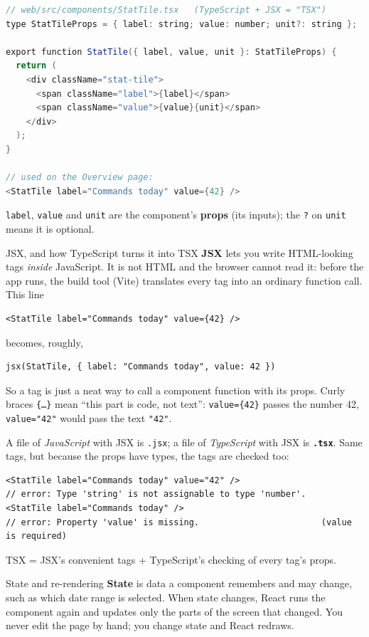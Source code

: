 \documentclass[11pt,a4paper]{article}
\begin{document}
\begin{lstlisting}[language=Java]
// web/src/components/StatTile.tsx   (TypeScript + JSX = "TSX")
type StatTileProps = { label: string; value: number; unit?: string };

export function StatTile({ label, value, unit }: StatTileProps) {
  return (
    <div className="stat-tile">
      <span className="label">{label}</span>
      <span className="value">{value}{unit}</span>
    </div>
  );
}

// used on the Overview page:
<StatTile label="Commands today" value={42} />
\end{lstlisting}

\noindent \texttt{label}, \texttt{value} and \texttt{unit} are the component's \textbf{props} (its
inputs); the \texttt{?} on \texttt{unit} means it is optional.

\begin{concept}{JSX, and how TypeScript turns it into TSX}
\textbf{JSX} lets you write HTML-looking tags \emph{inside} JavaScript. It is not HTML and the
browser cannot read it: before the app runs, the build tool (Vite) translates every tag into an
ordinary function call. This line
\begin{lstlisting}
<StatTile label="Commands today" value={42} />
\end{lstlisting}
becomes, roughly,
\begin{lstlisting}
jsx(StatTile, { label: "Commands today", value: 42 })
\end{lstlisting}
So a tag is just a neat way to call a component function with its props. Curly braces
\texttt{\{\ldots\}} mean ``this part is code, not text'': \texttt{value=\{42\}} passes the number 42,
\texttt{value="42"} would pass the text \texttt{"42"}.

A file of \emph{JavaScript} with JSX is \texttt{.jsx}; a file of \emph{TypeScript} with JSX is
\textbf{\texttt{.tsx}}. Same tags, but because the props have types, the tags are checked too:
\begin{lstlisting}
<StatTile label="Commands today" value="42" />
// error: Type 'string' is not assignable to type 'number'.
<StatTile label="Commands today" />
// error: Property 'value' is missing.                        (value is required)
\end{lstlisting}
TSX = JSX's convenient tags + TypeScript's checking of every tag's props.
\end{concept}

\begin{concept}{State and re-rendering}
\textbf{State} is data a component remembers and may change, such as which date range is
selected. When state changes, React runs the component again and updates only the parts of the
screen that changed. You never edit the page by hand; you change state and React redraws.
\end{concept}
\end{document}
